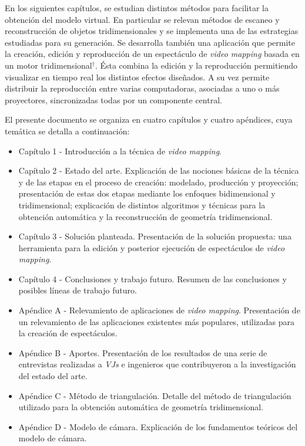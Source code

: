 En los siguientes capítulos, se estudian distintos métodos para facilitar la obtención del modelo virtual. En particular se relevan métodos de escaneo y reconstrucción de objetos tridimensionales y se implementa una de las estrategias estudiadas para su generación.
Se desarrolla también una aplicación que permite la creación, edición y reproducción de un espectáculo de \emph{video mapping} basada en un motor tridimensional$^\dagger$. Ésta combina la edición y la reproducción permitiendo visualizar en tiempo real los distintos efectos diseñados. A su vez permite distribuir la reproducción entre varias computadoras, asociadas a uno o más proyectores, sincronizadas todas por un componente central.

El presente documento se organiza en cuatro capítulos y cuatro apéndices, cuya temática se detalla a continuación:
\begin{itemize}
\item Capítulo 1 - Introducción a la técnica de \emph{video mapping}.
\item Capítulo 2 - Estado del arte. Explicación de las nociones básicas de la técnica y de las etapas en el proceso de creación: modelado, producción y proyección; presentación de estas dos etapas mediante los enfoques bidimensional y tridimensional; explicación de distintos algoritmos y técnicas para la obtención automática y la reconstrucción de geometría tridimensional.
\item Capítulo 3 - Solución planteada. Presentación de la solución propuesta: una herramienta para la edición y posterior ejecución de espectáculos de \emph{video mapping}.
\item Capítulo 4 - Conclusiones y trabajo futuro. Resumen de las conclusiones y posibles líneas de trabajo futuro.
\item Apéndice A - Relevamiento de aplicaciones de \emph{video mapping}. Presentación de un relevamiento de las aplicaciones existentes más populares, utilizadas para la creación de espectáculos.
\item Apéndice B - Aportes. Presentación de los resultados de una serie de entrevistas realizadas a \emph{VJs} e ingenieros que contribuyeron a la investigación del estado del arte.
\item Apéndice C - Método de triangulación. Detalle del método de triangulación utilizado para la obtención automática de geometría tridimensional.
\item Apéndice D - Modelo de cámara. Explicación de los fundamentos teóricos del modelo de cámara.
\end{itemize}